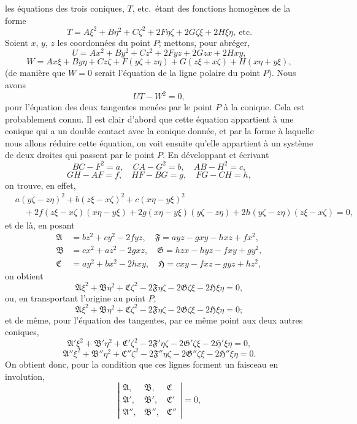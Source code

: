 \documentclass[12pt,a4paper]{article}
\providecommand{\fA}{\mathfrak{A}}
\providecommand{\fB}{\mathfrak{B}}
\providecommand{\fC}{\mathfrak{C}}
\providecommand{\fF}{\mathfrak{F}}
\providecommand{\fG}{\mathfrak{G}}
\providecommand{\fHH}{\mathfrak{H}}
\begin{document}
les \'equations des trois coniques, $T$, etc.\ \'etant des fonctions homog\`enes de la forme
\[
T = A\xi^2 + B\eta^2 + C\zeta^2 + 2F\eta\zeta + 2G\zeta\xi + 2H\xi\eta,\ \text{etc.}
\]
Soient $x$, $y$, $z$ les coordonn\'ees du point $P$; mettons, pour abr\'eger,
\[
U = Ax^2 + By^2 + Cz^2 + 2Fyz + 2Gzx + 2Hxy,
\]
\[
W = Ax\xi + By\eta + Cz\zeta + F(y\zeta + z\eta) + G(z\xi + x\zeta) + H(x\eta + y\xi),
\]
(de mani\`ere que $W = 0$ serait l'\'equation de la ligne polaire du point $P$). Nous avons
\[
UT - W^2 = 0,
\]
pour l'\'equation des deux tangentes men\'ees par le point $P$ \`a la conique. Cela est probablement connu. Il est clair d'abord que cette \'equation appartient \`a une conique qui a un double contact avec la conique donn\'ee, et par la forme \`a laquelle nous allons r\'eduire cette \'equation, on voit ensuite qu'elle appartient \`a un syst\`eme de deux droites qui passent par le point $P$. En d\'eveloppant et \'ecrivant
\[
BC - F^2 = a,\quad CA - G^2 = b,\quad AB - H^2 = c,
\]
\[
GH - AF = f,\quad HF - BG = g,\quad FG - CH = h,
\]
on trouve, en effet,
\begin{align*}
&a(y\zeta - z\eta)^2 + b(z\xi - x\zeta)^2 + c(x\eta - y\xi)^2\\
&\quad + 2f(z\xi - x\zeta)(x\eta - y\xi) + 2g(x\eta - y\xi)(y\zeta - z\eta) + 2h(y\zeta - z\eta)(z\xi - x\zeta) = 0,
\end{align*}
et de l\`a, en posant
\begin{align*}
\fA &= bz^2 + cy^2 - 2fyz,\quad \fF = ayz - gxy - hxz + fx^2,\\
\fB &= cx^2 + az^2 - 2gxz,\quad \fG = hzx - hyz - fxy + gy^2,\\
\fC &= ay^2 + bx^2 - 2hxy,\quad \fHH = cxy - fxz - gyz + hz^2,
\end{align*}
on obtient
\[
\fA\xi^2 + \fB\eta^2 + \fC\zeta^2 - 2\fF\eta\zeta - 2\fG\zeta\xi - 2\fHH\xi\eta = 0,
\]
ou, en transportant l'origine au point $P$,
\[
\fA\xi^2 + \fB\eta^2 + \fC\zeta^2 - 2\fF\eta\zeta - 2\fG\zeta\xi - 2\fHH\xi\eta = 0;
\]
et de m\^eme, pour l'\'equation des tangentes, par ce m\^eme point aux deux autres coniques,
\[
\fA'\xi^2 + \fB'\eta^2 + \fC'\zeta^2 - 2\fF'\eta\zeta - 2\fG'\zeta\xi - 2\fHH'\xi\eta = 0,
\]
\[
\fA''\xi^2 + \fB''\eta^2 + \fC''\zeta^2 - 2\fF''\eta\zeta - 2\fG''\zeta\xi - 2\fHH''\xi\eta = 0.
\]
On obtient donc, pour la condition que ces lignes forment un faisceau en involution,
\[
\left|\begin{array}{ccc}
\fA, & \fB, & \fC\\
\fA', & \fB', & \fC'\\
\fA'', & \fB'', & \fC''
\end{array}\right| = 0,
\]
\end{document}
